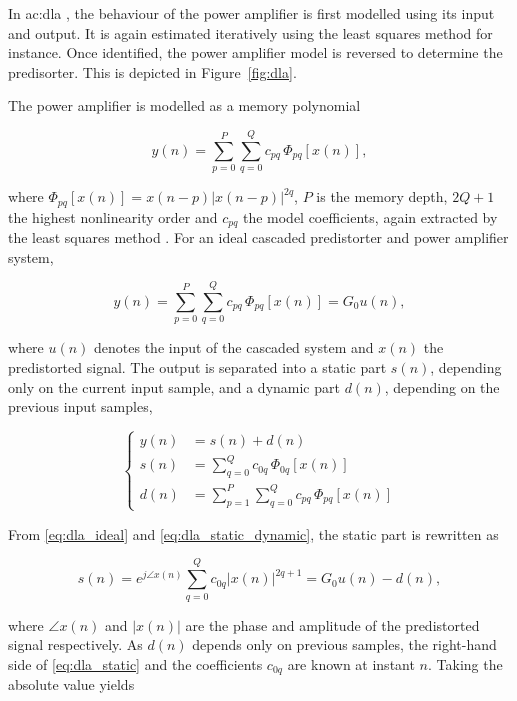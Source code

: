 In \gls{ac:dla} \cite{kim2001, zhou2007, cottais2006}, the behaviour of the power amplifier is first modelled using its input and output. It is again estimated iteratively using the least squares method for instance. Once identified, the power amplifier model is reversed to determine the predisorter. This is depicted in Figure~\ref{fig:dla}.

The power amplifier is modelled as a memory polynomial

\begin{equation}
  y(n) = \sum_{p=0}^{P}\sum_{q=0}^{Q} c_{pq}\,\Phi_{pq}\!\left[x(n)\right],
  \label{eq:dla_pa_model}
\end{equation}

where $\Phi_{pq}[x(n)] = x(n-p)|x(n-p)|^{2q}$, $P$ is the memory depth, $2Q+1$ the highest nonlinearity order and $c_{pq}$ the model coefficients, again extracted by the least squares method \cite{feng2016}. For an ideal cascaded predistorter and power amplifier system,

\begin{equation}
  y(n) = \sum_{p=0}^{P}\sum_{q=0}^{Q} c_{pq}\,\Phi_{pq}\!\left[x(n)\right] = G_0 u(n),
  \label{eq:dla_ideal}
\end{equation}

where $u(n)$ denotes the input of the cascaded system and $x(n)$ the predistorted signal. The output is separated into a static part $s(n)$, depending only on the current input sample, and a dynamic part $d(n)$, depending on the previous input samples,

\begin{equation}
  \left\{
  \begin{aligned}
    y(n) &= s(n) + d(n) \\
    s(n) &= \sum_{q=0}^{Q} c_{0q}\,\Phi_{0q}\!\left[x(n)\right] \\
    d(n) &= \sum_{p=1}^{P}\sum_{q=0}^{Q} c_{pq}\,\Phi_{pq}\!\left[x(n)\right]
  \end{aligned}
  \right.
  \label{eq:dla_static_dynamic}
\end{equation}

From \eqref{eq:dla_ideal} and \eqref{eq:dla_static_dynamic}, the static part is rewritten as

\begin{equation}
  s(n) = e^{j\angle x(n)}\sum_{q=0}^{Q} c_{0q}\left|x(n)\right|^{2q+1} = G_0 u(n) - d(n),
  \label{eq:dla_static}
\end{equation}

where $\angle x(n)$ and $|x(n)|$ are the phase and amplitude of the predistorted signal respectively. As $d(n)$ depends only on previous samples, the right-hand side of \eqref{eq:dla_static} and the coefficients $c_{0q}$ are known at instant $n$. Taking the absolute value yields

